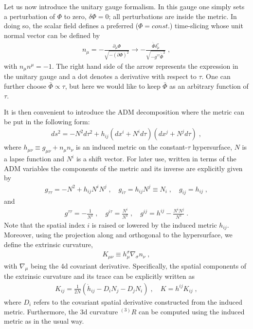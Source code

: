 \documentclass[a4paper,11pt]{article}
\numberwithin{equation}{section}
\begin{document}
Let us now introduce the unitary gauge formalism. In this gauge one simply sets a perturbation of $\Phi$ to zero, $\delta \Phi = 0$; all perturbations are inside the metric. In doing so, the scalar field defines a preferred ($\Phi = const.$) time-slicing whose unit normal vector can be defined by
\begin{align}\label{eq:normal_vec}
n_\mu = - \frac{\partial_\mu \Phi}{\sqrt{-(\partial \Phi)^2}}  \rightarrow - \frac{\dot{\bar{\Phi}}\delta_\mu^\tau}{\sqrt{-g^{\tau\tau}\dot{\bar{\Phi}}^2}}  \;, 
\end{align}
with $n_\mu n^\mu = -1$. The right hand side of the arrow represents the expression in the unitary gauge and a dot denotes a derivative with respect to $\tau$. One can further choose $\bar{\Phi} \propto \tau$, but here we would like to keep $\bar{\Phi}$ as an arbitrary function of $\tau$.

It is then convenient to introduce the ADM decomposition where the metric can be put in the following form:
\begin{align}\label{eq:ADM_metric}
ds^2 = -N^2 d\tau^2 + h_{ij}(dx^i + N^i d\tau)(dx^j + N^j d\tau) \;,
\end{align}
where $h_{\mu\nu} \equiv g_{\mu\nu} + n_\mu n_\nu$ is an induced metric on the constant-$\tau$ hypersurface, $N$ is a lapse function and $N^i$ is a shift vector.  For later use, written in terms of the ADM variables the components of the metric and its inverse are explicitly given by
\begin{align}\label{eq:metric_ADM}
g_{\tau\tau} = -N^2 + h_{ij}N^i N^j \;, \quad g_{i\tau} = h_{ij}N^j \equiv N_i \;, \quad g_{ij} = h_{ij} \;, 
\end{align}
and 
\begin{align}\label{eq:inverse_metric_ADM}
g^{\tau\tau} = -\frac{1}{N^2} \;, \quad g^{i\tau} = \frac{N^i}{N^2} \;, \quad g^{ij} = h^{ij} - \frac{N^iN^j}{N^2} \;.
\end{align}
Note that the spatial index $i$ is raised or lowered by the induced metric $h_{ij}$. Moreover, using the projection along and orthogonal to the hypersurface, we define the extrinsic curvature,
\begin{align}
K_{\mu\nu} \equiv h_\mu^\sigma \nabla_\sigma n_\nu \;,
\end{align}
with $\nabla_\mu$ being the 4d covariant derivative. Specifically, the spatial components of the extrinsic curvature and its trace can be explicitly written as
\begin{align}
K_{ij} = \frac{1}{2N}(\dot{h}_{ij} - D_iN_j - D_jN_i) \;, \quad K = h^{ij}K_{ij} \;,
\end{align} 
where $D_i$ refers to the covariant spatial derivative constructed from the induced metric. Furthermore, the 3d curvature ${}^{(3)}\!R$ can be computed using the induced metric as in the usual way. 
 
\end{document}
